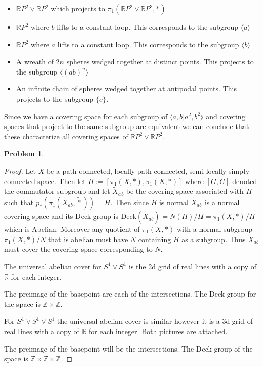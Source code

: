 \documentclass[10pt]{article}
\newcommand{\sk}{\vskip 10mm}
\newcommand{\bb}[1]{\mathbb{#1}}
\newcommand{\wt}[1]{\widetilde{#1}}
\theoremstyle{plain}
\newtheorem{problem}{Problem}
\theoremstyle{remark}
\begin{document}
\begin{itemize}
\item $\bb{R}P^2\vee \bb{R}P^2$ which projects to $\pi_1(\bb{R}P^2\vee \bb{R}P^2,*)$
\item $\bb{R}P^2$ where $b$ lifts to a constant loop. This corresponds to
  the subgroup $\langle a\rangle$
\item $\bb{R}P^2$ where $a$ lifts to a constant loop. This corresponds to
  the subgroup $\langle b\rangle$
\item A wreath of $2n$ spheres wedged together at distinct points.
  This projects to the subgroup $\langle (ab)^n\rangle$
\item An infinite chain of spheres wedged together at antipodal points.
  This projects to the subgroup $\{e\}$.
\end{itemize}

Since we have a covering space for each subgroup of $\langle a,b|a^2,b^2\rangle$ and
covering spaces that project to the same subgroup are equivalent we
can conclude that these characterize all covering spaces of $\bb{R}P^2\vee \bb{R}P^2$.

\sk

\begin{problem} %
  
\end{problem}

\begin{proof}
  Let $X$ be a path connected, locally path connected, semi-locally simply
  connected space. Then let $H:=[\pi_1(X,*),\pi_1(X,*)]$ where
  $[G,G]$ denoted the commutator subgroup and let $\widetilde{X}_{ab}$
  be the covering space associated with $H$ such that
  $p_*(\pi_1(\widetilde{X}_{ab},\widetilde{*}))=H$. Then since $H$ is normal
  $\widetilde{X}_{ab}$ is a normal covering space and its Deck group is
  $\text{Deck}(\widetilde{X}_{ab})=N(H)/H=\pi_1(X,*)/H$
  which is Abelian. Moreover any quotient of $\pi_1(X,*)$ with a normal
  subgroup $\pi_1(X,*)/N$ that is abelian must have $N$ containing $H$ as a
  subgroup. Thus $\wt{X}_{ab}$ must cover the covering space corresponding
  to $N$.

  The universal abelian cover for $S^1\vee S^1$ is the 2d grid of real lines
  with a copy of $\bb{R}$ for each integer.

  The preimage of the basepoint are each of the intersections. The
  Deck group for the space is $\bb{Z}\times\bb{Z}$.

  For $S^1\vee S^1 \vee S^1$ the universal abelian cover is similar however
  it is a 3d grid of real lines with a copy of $\bb{R}$ for each integer.
  Both pictures are attached.

  The preimage of the basepoint will be the intersections. The Deck group
  of the space is $\bb{Z}\times\bb{Z}\times\bb{Z}$.
\end{proof}

\end{document}
